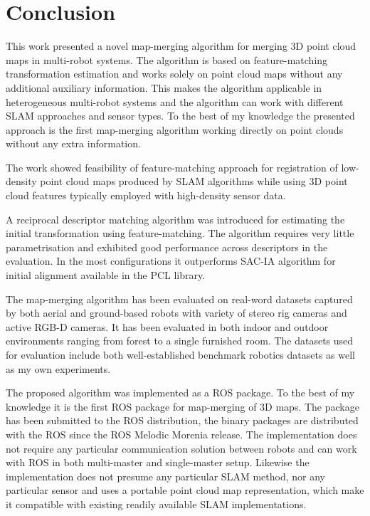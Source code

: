 \chapter*{Conclusion}

This work presented a novel map-merging algorithm for merging \gls{3D} point cloud maps in multi-robot systems. The algorithm is based on feature-matching transformation estimation and works solely on point cloud maps without any additional auxiliary information. This makes the algorithm applicable in heterogeneous multi-robot systems and the algorithm can work with different \gls{SLAM} approaches and sensor types. To the best of my knowledge the presented approach is the first map-merging algorithm working directly on point clouds without any extra information.

The work showed feasibility of feature-matching approach for registration of low-density point cloud maps produced by \gls{SLAM} algorithms while using \gls{3D} point cloud features typically employed with high-density sensor data.

A reciprocal descriptor matching algorithm was introduced for estimating the initial transformation using feature-matching. The algorithm requires very little parametrisation and exhibited good performance across descriptors in the evaluation. In the most configurations it outperforms \gls{SAC-IA} algorithm for initial alignment available in the \gls{PCL} library.

The map-merging algorithm has been evaluated on real-word datasets captured by both aerial and ground-based robots with variety of stereo rig cameras and active \gls{RGB-D} cameras. It has been evaluated in both indoor and outdoor environments ranging from forest to a single furnished room. The datasets used for evaluation include both well-established benchmark robotics datasets as well as my own experiments.

The proposed algorithm was implemented as a \gls{ROS} package. To the best of my knowledge it is the first \gls{ROS} package for map-merging of \gls{3D} maps. The package has been submitted to the \gls{ROS} distribution, the binary packages are distributed with the \gls{ROS} since the \gls{ROS} Melodic Morenia release. The implementation does not require any particular communication solution between robots and can work with \gls{ROS} in both multi-master and single-master setup. Likewise the implementation does not presume any particular \gls{SLAM} method, nor any particular sensor and uses a portable point cloud map representation, which make it compatible with existing readily available \gls{SLAM} implementations.

